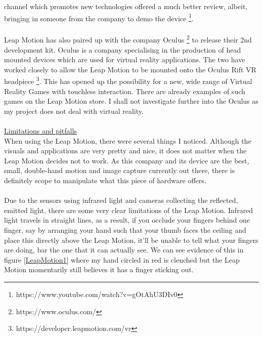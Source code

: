 \documentclass[11pt]{report}
\begin{document}
channel which promotes new technologies offered a much better review, 
albeit, bringing in someone from the company to demo the 
device \footnote{https://www.youtube.com/watch?v=gOtAhU3DIv0}.
\\ \\
Leap Motion has also paired up with the company Oculus
\footnote{https://www.oculus.com/} to release their 2nd 
development kit. Oculus is a company specialising in the production of head
mounted devices which are used for virtual reality applications. 
The two have worked closely to allow the Leap Motion to be mounted
onto the Oculus Rift VR headpiece \footnote{https://developer.leapmotion.com/vr}.
This has opened up the possibility for a new, wide range of 
Virtual Reality Games with touchless interaction. There are already examples
of such games on the Leap Motion store. I shall not investigate further into the
Oculus as my project does not deal with virtual reality.
\\ \\
\underline{Limitations and pitfalls} \\
When using the Leap Motion, there were several things I noticed. Although the 
visuals and applications are very pretty and nice, it does not matter when the
Leap Motion decides not to work. As this company and its 
device are the best, small, double-hand motion and image capture currently out
there, there is definitely scope to manipulate what this piece of hardware offers.
\\ \\
Due to the sensors using infrared light and cameras collecting the reflected, 
emitted light, there are some very clear limitations of the Leap Motion. Infrared
light travels in straight lines, as a result, if you occlude your fingers behind
one finger, say by arranging your hand such that your thumb faces the ceiling and 
place this directly above the Leap Motion, it'll be unable to tell what your 
fingers are doing, bar the one that it can actually see. We can see evidence of
this in figure \ref{LeapMotion1} where my hand circled in red is clenched but the
Leap Motion momentarily still believes it has a finger sticking out.
\\
\end{document}

